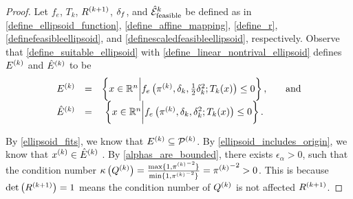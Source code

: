 \begin{proof}

Let 
$f_e$,
$T_k$,
${R^{(k+1)}}$, $\delta_{f}$, and ${{\mathcal {\hat E}_{\text{feasible}}}^k}$
be defined as in
\cref{define_ellipsoid_function},
\cref{define_affine_mapping},
\cref{define_r},
\cref{definefeasibleellipsoid}, and
\cref{definescaledfeasibleellipsoid},
respectively. 
Observe that \cref{define_suitable_ellipsoid} with \cref{define_linear_nontrival_ellipsoid} defines  ${E^{(k)}}$ and ${{\hat E}^{(k)}}$ to be
\begin{align*}
\begin{array}{cccc}
{E^{(k)}} &=& \left\{x \in \mathbb R^n \bigg | f_e\left(\pi^{(k)}, \delta_k, \frac 1 2 \delta_k^2; T_k(x)\right) \le 0\right\}, &\quad \textrm{and}  \\
{{\hat E}^{(k)}} &=& \left\{x \in \mathbb R^n \bigg | f_e\left({\pi^{(k)}}, \delta_k, \delta_k^2; T_k(x)\right) \le 0\right\}.&
\end{array}
\end{align*}

By \cref{ellipsoid_fits}, we know that ${E^{(k)}} \subseteq {{\mathcal{P}}^{(k)}}$.
By \cref{ellipsoid_includes_origin}, we know that $x^{(k)} \in {{\hat E}^{(k)}}$ .
By \cref{alphas_are_bounded}, there exists $\epsilon_{\alpha} > 0$, such that the condition number 
${\kappa}\left({Q^{(k)}}\right) = \frac{\max\{1, {\pi^{(k)}}^{-2}\}}{\min\{1, {\pi^{(k)}}^{-2}\}} = {\pi^{(k)}}^{-2} > 0$.
This is because $\det\left({R^{(k+1)}}\right) = 1$ means the condition number of ${Q^{(k)}}$ is not affected ${R^{(k+1)}}$.
\end{proof}




